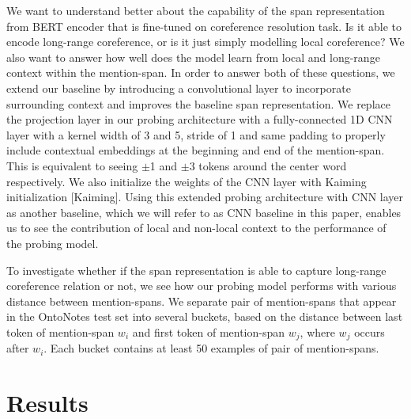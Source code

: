 \documentclass[11pt]{article}
\begin{document}
We want to understand better about the capability of the span representation from BERT encoder that is fine-tuned on coreference resolution task. Is it able to encode long-range coreference, or is it just simply modelling local coreference? We also want to answer how well does the model learn from local and long-range context within the mention-span. In order to answer both of these questions, we extend our baseline by introducing a convolutional layer to incorporate surrounding context and improves the baseline span representation. We replace the projection layer in our probing architecture with a fully-connected 1D CNN layer with a kernel width of 3 and 5, stride of 1 and same padding to properly include contextual embeddings at the beginning and end of the mention-span. This is equivalent to seeing $\pm$1 and $\pm$3 tokens around the center word respectively. We also initialize the weights of the CNN layer with Kaiming initialization [Kaiming]. Using this extended probing architecture with CNN layer as another baseline, which we will refer to as CNN baseline in this paper, enables us to see the contribution of local and non-local context to the performance of the probing model. 

To investigate whether if the span representation is able to capture long-range coreference relation or not, we see how our probing model performs with various distance between mention-spans. We separate pair of mention-spans that appear in the OntoNotes test set into several buckets, based on the distance between last token of mention-span $w_{i}$ and first token of mention-span $w_{j}$, where $w_{j}$ occurs after $w_{i}$. Each bucket contains at least 50 examples of pair of mention-spans. 








\section{Results}
\end{document}
